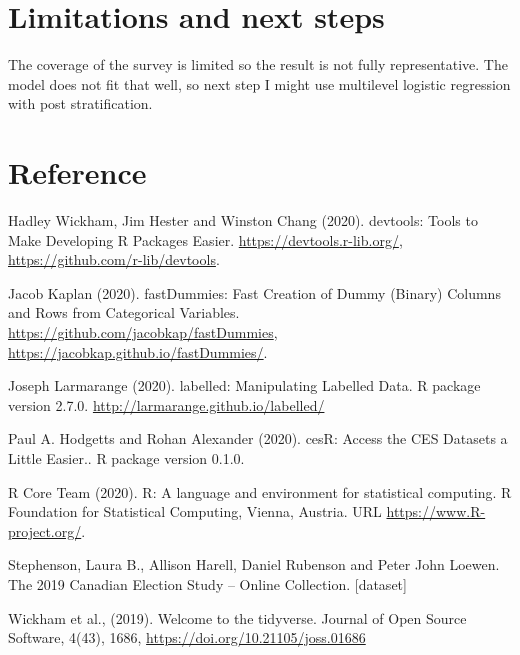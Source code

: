 \documentclass[
]{article}
\begin{document}
\hypertarget{limitations-and-next-steps}{%
\section{Limitations and next steps}\label{limitations-and-next-steps}}

The coverage of the survey is limited so the result is not fully
representative. The model does not fit that well, so next step I might
use multilevel logistic regression with post stratification.

\hypertarget{reference}{%
\section{Reference}\label{reference}}

Hadley Wickham, Jim Hester and Winston Chang (2020). devtools: Tools to
Make Developing R Packages Easier. \url{https://devtools.r-lib.org/},
\url{https://github.com/r-lib/devtools}.

Jacob Kaplan (2020). fastDummies: Fast Creation of Dummy (Binary)
Columns and Rows from Categorical Variables.
\url{https://github.com/jacobkap/fastDummies},
\url{https://jacobkap.github.io/fastDummies/}.

Joseph Larmarange (2020). labelled: Manipulating Labelled Data. R
package version 2.7.0. \url{http://larmarange.github.io/labelled/}

Paul A. Hodgetts and Rohan Alexander (2020). cesR: Access the CES
Datasets a Little Easier.. R package version 0.1.0.

R Core Team (2020). R: A language and environment for statistical
computing. R Foundation for Statistical Computing, Vienna, Austria. URL
\url{https://www.R-project.org/}.

Stephenson, Laura B., Allison Harell, Daniel Rubenson and Peter John
Loewen. The 2019 Canadian Election Study -- Online Collection.
{[}dataset{]}

Wickham et al., (2019). Welcome to the tidyverse. Journal of Open Source
Software, 4(43), 1686, \url{https://doi.org/10.21105/joss.01686}
\end{document}

